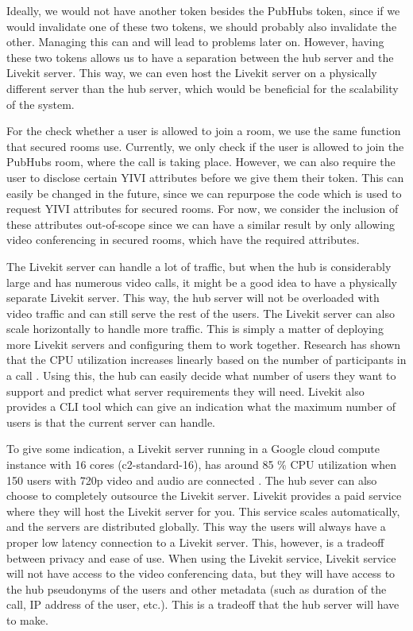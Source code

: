 \documentclass{report}
\begin{document}
Ideally, we would not have another token besides the PubHubs token, since if we would invalidate one of these two
tokens, we should probably also invalidate the other. Managing this can and will lead to problems later on. However,
having these two tokens allows us to have a separation between the hub server and the Livekit server. This way, we
can even host the Livekit server on a physically different server than the hub server, which would be beneficial for
the scalability of the system.

For the check whether a user is allowed to join a room, we use the same function that secured rooms use. Currently,
we only check if the user is allowed to join the PubHubs room, where the call is taking place. However, we can also
require the user to disclose certain YIVI attributes before we give them their token. This can easily be changed in the
future, since we can repurpose the code which is used to request YIVI attributes for secured rooms. For now, we consider
the inclusion of these attributes out-of-scope since we can have a similar result by only allowing video conferencing
in secured rooms, which have the required attributes.

The Livekit server can handle a lot of traffic, but when the hub is considerably large and has numerous video calls, it
might be a good idea to have a physically separate Livekit server. This way, the hub server will not be overloaded with
video traffic and can still serve the rest of the users. The Livekit server can also scale horizontally to handle
more traffic. This is simply a matter of deploying more Livekit servers and configuring them to work together.
Research has shown that the CPU utilization increases linearly based on the number of participants in a call
\cite{muscariello_securing_2023}. Using this, the hub can easily decide what number of users
they want to support and predict what server requirements they will need. Livekit also provides a CLI tool which
can give an indication what the maximum number of users is that the current server can handle.

To give some indication, a Livekit server running in a Google cloud compute instance with 16 cores
(c2-standard-16), has around 85 \% CPU utilization when 150 users with 720p video and audio are connected
\cite{noauthor_benchmarking_nodate}. The hub sever can also choose to completely outsource the Livekit server.
Livekit provides a paid service where they will host the Livekit server for you. This service scales
automatically, and the servers are distributed globally. This way the users will always have a proper low
latency connection to a Livekit server. This, however, is a tradeoff between privacy and ease of use. When using
the Livekit service, Livekit service will not have access to the video conferencing data, but they will have access to
the hub pseudonyms of the users and other metadata (such as duration of the call, IP address of the user, etc.). This
is a tradeoff that the hub server will have to make.
\end{document}
